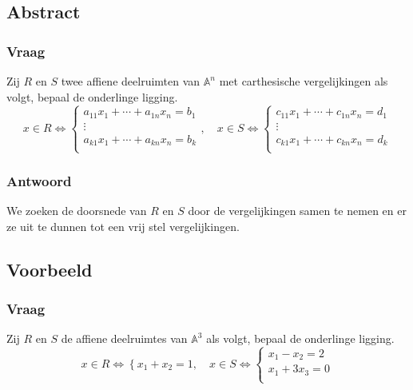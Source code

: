 \documentclass[main.tex]{subfiles}
\begin{document}
\subsection*{Abstract}
\subsubsection*{Vraag}
\begin{center}
  Zij $R$ en $S$ twee affiene deelruimten van $\mathbb{A}^{n}$ met carthesische vergelijkingen als volgt, bepaal de onderlinge ligging.
  \[
  x \in R \Leftrightarrow
  \left\{
    \begin{array}{c}
      a_{11}x_{1} + \dotsb + a_{1n}x_{n} = b_{1}\\
      \vdots\\
      a_{k1}x_{1} + \dotsb + a_{kn}x_{n} = b_{k}\\
    \end{array}
  \right.
  ,\quad
  x \in S \Leftrightarrow
  \left\{
    \begin{array}{c}
      c_{11}x_{1} + \dotsb + c_{1n}x_{n} = d_{1}\\
      \vdots\\
      c_{k1}x_{1} + \dotsb + c_{kn}x_{n} = d_{k}\\
    \end{array}
  \right.
  \]
\end{center}
\subsubsection*{Antwoord}
We zoeken de doorsnede van $R$ en $S$ door de vergelijkingen samen te nemen en er ze uit te dunnen tot een vrij stel vergelijkingen.

\subsection*{Voorbeeld}
\subsubsection*{Vraag}
\begin{center}
  Zij $R$ en $S$ de affiene deelruimtes van $\mathbb{A}^{3}$ als volgt, bepaal de onderlinge ligging.
  \[
  x \in R \Leftrightarrow
  \left\{
  x_{1}+x_{2}=1
  \right.
  ,\quad
  x\in S \Leftrightarrow
  \left\{
    \begin{array}{c}
      x_{1}-x_{2} = 2\\
      x_{1} + 3x_{3} = 0\\
    \end{array}
  \right.
  \]
\end{center}
\end{document}
